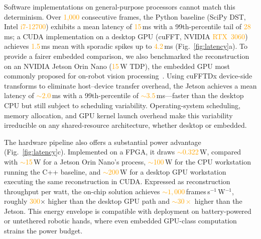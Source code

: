 \documentclass[10pt,a4paper]{article}
\newcommand{\placeholder}[1]{\textcolor{orange}{#1}}
\newcommand{\latPython}{\placeholder{15}}             %
\newcommand{\latCUDA}{\placeholder{1.5}}              %
\newcommand{\pwrFPGA}{\placeholder{0.322}}                %
\newcommand{\pwrGPU}{\placeholder{200}}               %
\begin{document}
Software implementations on general-purpose processors cannot match this determinism. Over \placeholder{1{,}000} consecutive frames, the Python baseline (SciPy DST, Intel \placeholder{i7-12700}) exhibits a mean latency of \latPython\,ms with a 99th-percentile tail of \placeholder{28}\,ms; a CUDA implementation on a desktop GPU (cuFFT, NVIDIA \placeholder{RTX~3060}) achieves \latCUDA\,ms mean with sporadic spikes up to \placeholder{4.2}\,ms (Fig.~\ref{fig:latency}a). To provide a fairer embedded comparison, we also benchmarked the reconstruction on an NVIDIA Jetson Orin Nano (\placeholder{15}\,W TDP), the embedded GPU most commonly proposed for on-robot vision processing~\cite{mittal2019jetsonsurvey}. Using cuFFTDx device-side transforms to eliminate host--device transfer overhead, the Jetson achieves a mean latency of \placeholder{${\sim}2.0$}\,ms with a 99th-percentile of \placeholder{${\sim}3.5$}\,ms---faster than the desktop CPU but still subject to scheduling variability. Operating-system scheduling, memory allocation, and GPU kernel launch overhead make this variability irreducible on any shared-resource architecture, whether desktop or embedded.

The hardware pipeline also offers a substantial power advantage (Fig.~\ref{fig:latency}c). Implemented on a FPGA, it draws \placeholder{${\sim}$\pwrFPGA}\,W, compared with \placeholder{${\sim}$15}\,W for a Jetson Orin Nano's process, \placeholder{${\sim}$100}\,W for the CPU workstation running the C++ baseline, and \placeholder{${\sim}$\pwrGPU}\,W for a desktop GPU workstation executing the same reconstruction in CUDA. Expressed as reconstruction throughput per watt, the on-chip solution achieves \placeholder{${\sim}1{,}000$}\,frames\,s$^{-1}$\,W$^{-1}$, roughly \placeholder{300}$\times$ higher than the desktop GPU path and \placeholder{${\sim}30\times$} higher than the Jetson. This energy envelope is compatible with deployment on battery-powered or untethered robotic hands, where even embedded GPU-class computation strains the power budget.
\end{document}
